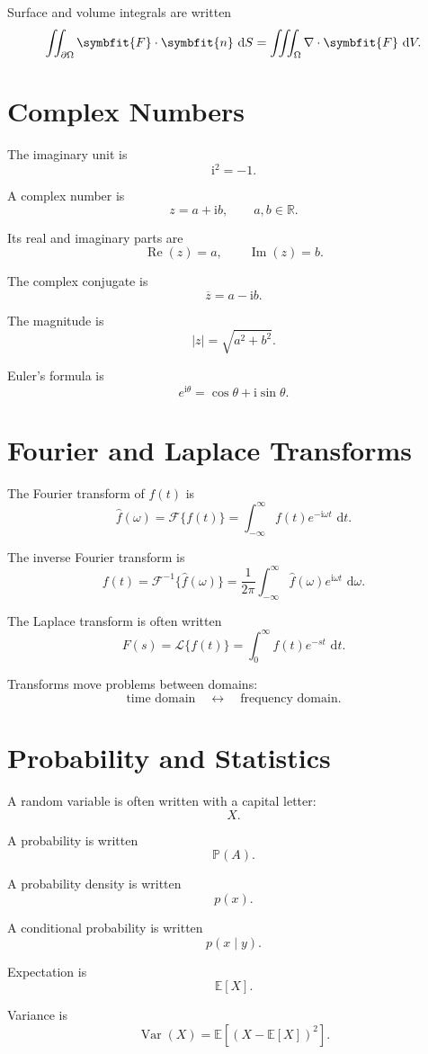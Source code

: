 \documentclass[11pt,twocolumn]{article}
\newcommand{\R}{\mathbb{R}}
\newcommand{\vct}[1]{\symbfit{#1}}   %
\newcommand{\abs}[1]{\left\lvert #1 \right\rvert}
\newcommand{\dd}{\,\mathrm{d}}
\newcommand{\divg}{\nabla \cdot}
\newcommand{\ii}{\mathrm{i}}
\newcommand{\Real}{\operatorname{Re}}
\newcommand{\Imag}{\operatorname{Im}}
\newcommand{\FT}{\mathcal{F}}
\newcommand{\IFT}{\mathcal{F}^{-1}}
\newcommand{\LT}{\mathcal{L}}
\newcommand{\fourier}[1]{\widehat{#1}}
\newcommand{\E}{\mathbb{E}}
\newcommand{\Var}{\operatorname{Var}}
\newcommand{\Prob}{\mathbb{P}}
\begin{document}
Surface and volume integrals are written
\[
\iint_{\partial\Omega}
\vct{F}\cdot\vct{n}\,\dd S
=
\iiint_{\Omega}
\divg\vct{F}\,\dd V.
\]

\section{Complex Numbers}

The imaginary unit is
\[
\ii^2=-1.
\]

A complex number is
\[
z=a+\ii b,
\qquad
a,b\in\R.
\]

Its real and imaginary parts are
\[
\Real(z)=a,
\qquad
\Imag(z)=b.
\]

The complex conjugate is
\[
\overline{z}=a-\ii b.
\]

The magnitude is
\[
\abs{z}
=
\sqrt{a^2+b^2}.
\]

Euler's formula is
\[
e^{\ii\theta}
=
\cos\theta+\ii\sin\theta.
\]

\section{Fourier and Laplace Transforms}

The Fourier transform of \(f(t)\) is
\[
\fourier{f}(\omega)
=
\FT\{f(t)\}
=
\int_{-\infty}^{\infty}
f(t)e^{-\ii\omega t}\,\dd t.
\]

The inverse Fourier transform is
\[
f(t)
=
\IFT\{\fourier{f}(\omega)\}
=
\frac{1}{2\pi}
\int_{-\infty}^{\infty}
\fourier{f}(\omega)e^{\ii\omega t}\,\dd \omega.
\]

The Laplace transform is often written
\[
F(s)
=
\LT\{f(t)\}
=
\int_0^\infty
f(t)e^{-st}\,\dd t.
\]

Transforms move problems between domains:
\[
\text{time domain}
\quad
\longleftrightarrow
\quad
\text{frequency domain}.
\]

\section{Probability and Statistics}

A random variable is often written with a capital letter:
\[
X.
\]

A probability is written
\[
\Prob(A).
\]

A probability density is written
\[
p(x).
\]

A conditional probability is written
\[
p(x\mid y).
\]

Expectation is
\[
\E[X].
\]

Variance is
\[
\Var(X)
=
\E\left[(X-\E[X])^2\right].
\]
\end{document}
